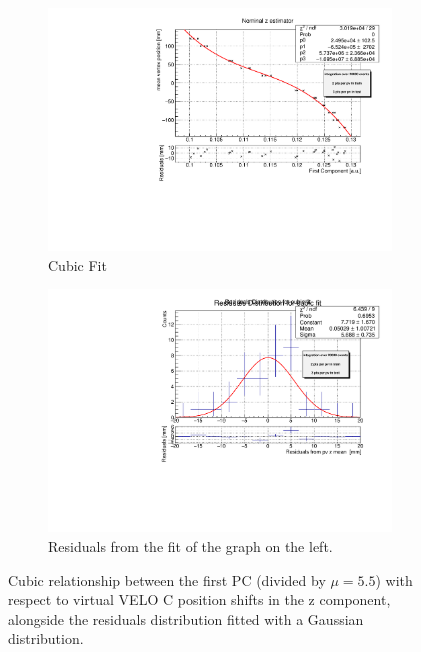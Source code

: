 \begin{figure}
    \centering
    \begin{subfigure}{0.48\textwidth}
    \includegraphics[width=\linewidth]{figures/z_fit_veloC_MC_residuals.pdf}
    \caption{Cubic Fit}\label{fig:z_veloC_fit_MC}
    \end{subfigure}
    \begin{subfigure}{0.48\textwidth}
    \includegraphics[width=\linewidth]{figures/z_res_veloC_MC_normalised.pdf}
    \caption{Residuals from the fit of the graph on the left. }\label{fig:z_veloC_res_MC}
    \end{subfigure}
    \caption{Cubic relationship between the first PC (divided by $\mu=5.5$) with respect to virtual VELO C position shifts in the z component, alongside the residuals distribution fitted with a Gaussian distribution.}
    \label{fig:z_veloC_MC}
\end{figure}

